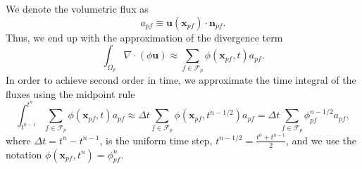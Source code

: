 \documentclass[../thesis.tex]{subfiles}
\begin{document}
We denote the volumetric flux as
\[
	a_{pf} \equiv \mathbf{u}(\mathbf{x}_{pf}) \cdot \mathbf{n}_{pf}.
\]
Thus, we end up with the approximation
of the divergence term
\[
	\int_{\Omega_p}
	\nabla \cdot \left(\phi\mathbf{u}\right)
	\approx
	\sum_{f \in \mathcal{F}_p} \phi(\mathbf{x}_{pf},t) a_{pf}.
\]
In order to achieve second order in time, we approximate
the time integral of the fluxes using the midpoint rule
\[
	\int_{t^{n-1}}^{t^n} \sum_{f \in \mathcal{F}_p} \phi(\mathbf{x}_{pf},t) a_{pf}
	\approx
	\Delta t \sum_{f \in \mathcal{F}_p}
	\phi(\mathbf{x}_{pf},t^{n-1/2}) a_{pf}
	=\Delta t \sum_{f \in \mathcal{F}_p}
	\phi_{pf}^{n-1/2} a_{pf},
\]
where \(\Delta t = t^n - t^{n-1}\), is the uniform time step,
\(t^{n-1/2} = \frac{t^n+t^{n-1}}{2}\), and we use the notation
\(\phi(\mathbf{x}_{pf},t^{n}) = \phi_{pf}^{n}\).
\end{document}
